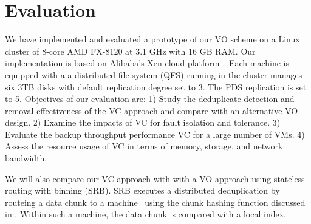 
\section{Evaluation}
\label{sect:exper}

We have implemented and evaluated a prototype of our VO scheme on a Linux cluster
of 8-core AMD FX-8120 at 3.1 GHz with 16 GB RAM. 
Our implementation is based on Alibaba's Xen cloud platform~\cite{Aliyun,WeiZhangIEEE}.
Each machine  is equipped with a 
a distributed file system (QFS) running in the cluster manages six 3TB disks
with default replication degree set to 3. The PDS replication is set to 5.
Objectives of our evaluation are:
1) Study the deduplicate detection and removal effectiveness of the VC approach and compare with an alternative VO
design.
2) Examine the impacts of VC for fault isolation and tolerance. 
3) Evaluate the backup throughput performance VC  for a large number of VMs.
4) Assess the resource usage  of VC in terms of memory, storage, and network bandwidth.


We will also compare our VC approach with  with
a VO approach  using stateless routing with binning (SRB).
SRB executes a distributed deduplication by routeing a data chunk to a machine~\cite{ParallelDataDomain}
using  the chunk hashing function discussed in \cite{??}. Within such a machine, the data chunk is compared with
a local index. 

